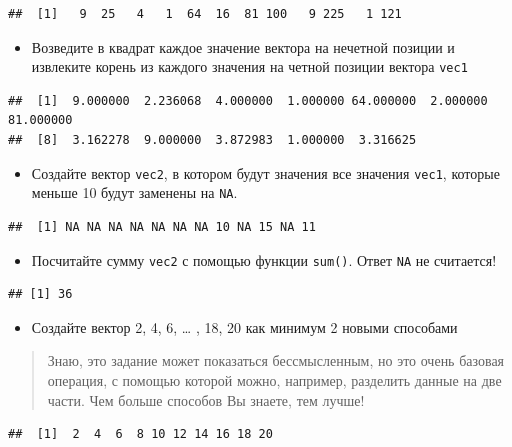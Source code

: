 \documentclass[]{book}
\providecommand{\tightlist}{%
  \setlength{\itemsep}{0pt}\setlength{\parskip}{0pt}}
\begin{document}
\begin{verbatim}
##  [1]   9  25   4   1  64  16  81 100   9 225   1 121
\end{verbatim}

\begin{itemize}
\tightlist
\item
  Возведите в квадрат каждое значение вектора на нечетной позиции и
  извлеките корень из каждого значения на четной позиции вектора
  \texttt{vec1}
\end{itemize}

\begin{verbatim}
##  [1]  9.000000  2.236068  4.000000  1.000000 64.000000  2.000000 81.000000
##  [8]  3.162278  9.000000  3.872983  1.000000  3.316625
\end{verbatim}

\begin{itemize}
\tightlist
\item
  Создайте вектор \texttt{vec2}, в котором будут значения все значения
  \texttt{vec1}, которые меньше 10 будут заменены на \texttt{NA}.
\end{itemize}

\begin{verbatim}
##  [1] NA NA NA NA NA NA NA 10 NA 15 NA 11
\end{verbatim}

\begin{itemize}
\tightlist
\item
  Посчитайте сумму \texttt{vec2} с помощью функции \texttt{sum()}. Ответ
  \texttt{NA} не считается!
\end{itemize}

\begin{verbatim}
## [1] 36
\end{verbatim}

\begin{itemize}
\tightlist
\item
  Создайте вектор 2, 4, 6, \ldots{} , 18, 20 как минимум 2 новыми
  способами
\end{itemize}

\begin{quote}
Знаю, это задание может показаться бессмысленным, но это очень базовая
операция, с помощью которой можно, например, разделить данные на две
части. Чем больше способов Вы знаете, тем лучше!
\end{quote}

\begin{verbatim}
##  [1]  2  4  6  8 10 12 14 16 18 20
\end{verbatim}
\end{document}
